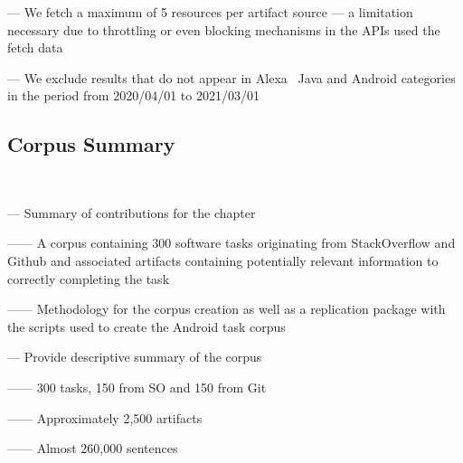 --- We fetch a maximum of 5 resources per artifact source --- a limitation necessary due to throttling or even blocking mechanisms in the APIs used the fetch data \vspace{3mm}

--- We exclude results that do not appear in Alexa~\cite{alexa} Java and Android categories in the period from 2020/04/01
to 2021/03/01





\subsection{Corpus Summary}
\textcolor{white}{force ident} %


--- Summary of contributions for the chapter \vspace{3mm}

------ A corpus containing 300 software tasks originating from StackOverflow and Github and associated artifacts containing potentially relevant information to correctly completing the task \vspace{3mm}

------ Methodology for the corpus creation as well as a replication package with the scripts used to create the Android task corpus \vspace{3mm}


--- Provide descriptive summary of the corpus

------ 300 tasks, 150 from SO and 150 from Git

------ Approximately 2,500 artifacts

------ Almost 260,000 sentences







% 


